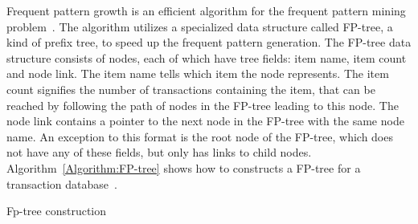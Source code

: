 Frequent pattern growth is an efficient algorithm for the frequent pattern mining problem~\cite{Han:2000:MFP:335191.335372}. The algorithm utilizes a specialized data structure called FP-tree, a kind of prefix tree, to speed up the frequent pattern generation. The FP-tree data structure consists of nodes, each of which have tree fields: item name, item count and node link. The item name tells which item the node represents. The item count signifies the number of transactions containing the item, that can be reached by following the path of nodes in the FP-tree leading to this node. The node link contains a pointer to the next node in the FP-tree with the same node name. An exception to this format is the root node of the FP-tree, which does not have any of these fields, but only has links to child nodes. Algorithm~\ref{Algorithm:FP-tree} shows how to constructs a FP-tree for a transaction database~\cite{Han:2000:MFP:335191.335372}.

\begin{algorithm}[!htbp]
	\SetAlgoLined\DontPrintSemicolon
	\setcounter{AlgoLine}{0}
	\caption{Fp-tree construction}
	\label{Algorithm:FP-tree}
\end{algorithm}  

